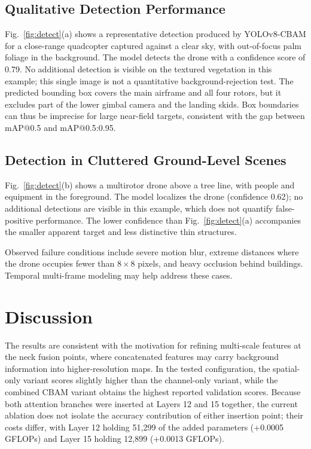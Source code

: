 \documentclass[conference]{IEEEtran}
\begin{document}
\subsection{Qualitative Detection Performance}

Fig.~\ref{fig:detect}(a) shows a representative detection produced by YOLOv8-CBAM for a close-range quadcopter captured against a clear sky, with out-of-focus palm foliage in the background. The model detects the drone with a confidence score of 0.79. No additional detection is visible on the textured vegetation in this example; this single image is not a quantitative background-rejection test. The predicted bounding box covers the main airframe and all four rotors, but it excludes part of the lower gimbal camera and the landing skids. Box boundaries can thus be imprecise for large near-field targets, consistent with the gap between mAP@0.5 and mAP@0.5:0.95.



\subsection{Detection in Cluttered Ground-Level Scenes}

Fig.~\ref{fig:detect}(b) shows a multirotor drone above a tree line, with people and equipment in the foreground. The model localizes the drone (confidence 0.62); no additional detections are visible in this example, which does not quantify false-positive performance. The lower confidence than Fig.~\ref{fig:detect}(a) accompanies the smaller apparent target and less distinctive thin structures.

Observed failure conditions include severe motion blur, extreme distances where the drone occupies fewer than $8\times8$ pixels, and heavy occlusion behind buildings. Temporal multi-frame modeling may help address these cases.

\section{Discussion}

The results are consistent with the motivation for refining multi-scale features at the neck fusion points, where concatenated features may carry background information into higher-resolution maps. In the tested configuration, the spatial-only variant scores slightly higher than the channel-only variant, while the combined CBAM variant obtains the highest reported validation scores. Because both attention branches were inserted at Layers 12 and 15 together, the current ablation does not isolate the accuracy contribution of either insertion point; their costs differ, with Layer 12 holding 51,299 of the added parameters (+0.0005 GFLOPs) and Layer 15 holding 12,899 (+0.0013 GFLOPs).
\end{document}
